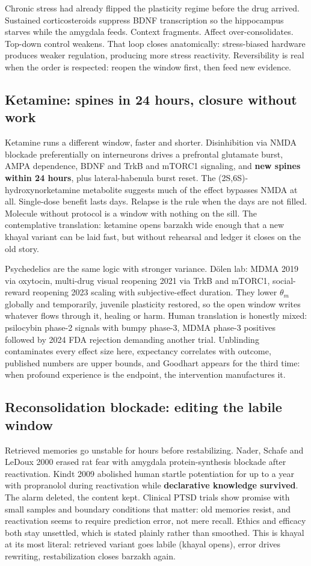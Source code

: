 Chronic stress had already flipped the plasticity regime before the drug arrived. Sustained corticosteroids suppress BDNF transcription so the hippocampus starves while the amygdala feeds. Context fragments. Affect over-consolidates. Top-down control weakens. That loop closes anatomically: stress-biased hardware produces weaker regulation, producing more stress reactivity. Reversibility is real when the order is respected: reopen the window first, then feed new evidence.

\subsection{Ketamine: spines in 24 hours, closure without work}

Ketamine runs a different window, faster and shorter. Disinhibition via NMDA blockade preferentially on interneurons drives a prefrontal glutamate burst, AMPA dependence, BDNF and TrkB and mTORC1 signaling, and \textbf{new spines within 24 hours}, plus lateral-habenula burst reset. The (2S,6S)-hydroxynorketamine metabolite suggests much of the effect bypasses NMDA at all. Single-dose benefit lasts days. Relapse is the rule when the days are not filled. Molecule without protocol is a window with nothing on the sill. The contemplative translation: ketamine opens barzakh wide enough that a new khayal variant can be laid fast, but without rehearsal and ledger it closes on the old story.

Psychedelics are the same logic with stronger variance. D\"olen lab: MDMA 2019 via oxytocin, multi-drug visual reopening 2021 via TrkB and mTORC1, social-reward reopening 2023 scaling with subjective-effect duration. They lower $\theta_m$ globally and temporarily, juvenile plasticity restored, so the open window writes whatever flows through it, healing or harm. Human translation is honestly mixed: psilocybin phase-2 signals with bumpy phase-3, MDMA phase-3 positives followed by 2024 FDA rejection demanding another trial. Unblinding contaminates every effect size here, expectancy correlates with outcome, published numbers are upper bounds, and Goodhart appears for the third time: when profound experience is the endpoint, the intervention manufactures it.

\subsection{Reconsolidation blockade: editing the labile window}

Retrieved memories go unstable for hours before restabilizing. Nader, Schafe and LeDoux 2000 erased rat fear with amygdala protein-synthesis blockade after reactivation. Kindt 2009 abolished human startle potentiation for up to a year with propranolol during reactivation while \textbf{declarative knowledge survived}. The alarm deleted, the content kept. Clinical PTSD trials show promise with small samples and boundary conditions that matter: old memories resist, and reactivation seems to require prediction error, not mere recall. Ethics and efficacy both stay unsettled, which is stated plainly rather than smoothed. This is khayal at its most literal: retrieved variant goes labile (khayal opens), error drives rewriting, restabilization closes barzakh again.

